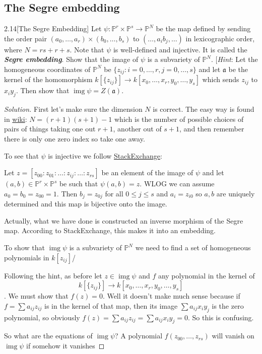 \subsection{The Segre embedding}

\begin{manualexercise}{2.14}[The Segre Embedding]
	Let $\psi:\mathbb{P}^r\times\mathbb{P}^s\to\mathbb{P}^N$ be the map defined by sending the order pair $(a_0,\ldots,a_r)\times(b_0,\ldots,b_s)$ to $(\ldots,a_ib_j,\ldots)$ in lexicographic order, where $N=rs+r+s$. Note that $\psi$ is well-defined and injective. It is called the \textbf{\textit{Segre embedding}}. Show that the image of $\psi$ is a subvariety of $\mathbb{P}^N$. [\textit{Hint}: Let the homogeneous coordinates of $\mathbb{P}^N$ be $\{z_{ij}:i=0,\ldots,r,j=0,\ldots,s\}$ and let $\mathfrak{a}$ be the kernel of the homomorphism $k[\{z_{ij}\}]\to k[x_0,\ldots,x_r,y_0,\ldots,y_s]$ which sends $z_{ij}$ to $x_iy_j$. Then show that $\operatorname{img}\psi=Z(\mathfrak{a})$.
\end{manualexercise}

\begin{proof}[Solution]
	First let's make sure the dimension $N$ is correct. The easy way is found in \href{https://en.wikipedia.org/wiki/Segre_embedding}{wiki}: $N=(r+1)(s+1)-1$ which is the number of possible choices of pairs of things taking one out $r+1$, another out of $s+1$, and then remember there is only one zero index so take one away.
	
	To see that $\psi$ is injective we follow \href{https://math.stackexchange.com/questions/3683364/segre-map-is-an-embedding}{StackExchange}: 
	{\color{azure}Let $z=[z_{00}:z_{01}:\ldots:z_{ij}:\ldots:z_{rs}]$ be an element of the image of $\psi$ and let $(a,b)\in\mathbb{P}^r\times\mathbb{P}^s$ be such that $\psi(a,b)=z$. WLOG we can assume $a_0=b_0=z_{00}=1$. Then $b_j=z_{0j}$ for all $0\leq j\leq s$ and $a_i=z_{i0}$ so $a,b$ are uniquely determined and this map is bijective onto the image.
	
	Actually, what we have done is constructed an inverse morphism of the Segre map. According to StackExchange, this makes it into an embedding.}
	
	To show that $\operatorname{img}\psi$ is a subvariety of $\mathbb{P}^N$ we need to find a set of homogeneous polynomials in $k[z_{ij}]$/
	
	Following the hint, as before let $z\in\operatorname{img}\psi$ and $f$ any polynomial in the kernel of \[k[\{z_{ij}\}]\to k[x_0,\ldots,x_r,y_0,\ldots,y_s]\]. We must show that $f(z)=0$. Well it doesn't make much sense because if $f=\sum a_{ij}z_{ij}$ is in the kernel of that map, then its image $\sum a_{ij}x_iy_j$ is the zero polynomial, so obviously $f(z)=\sum a_{ij}z_{ij}=\sum a_{ij}x_iy_j=0$. So this is confusing.
	
	So what are the equations of $\operatorname{img}\psi$? A polynomial $f(z_{00},\ldots,z_{rs})$ will vanish on $\operatorname{img}\psi$ if somehow it vanishes 
\end{proof}

